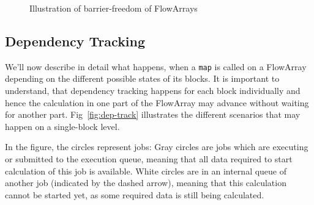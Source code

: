 \documentclass[runningheads,a4paper,fleqn]{llncs}
\begin{document}
\begin{figure}
  \caption{Illustration of barrier-freedom of FlowArrays}
  \label{fig:barrier-free}
\end{figure}

\subsection{Dependency Tracking}
We'll now describe in detail what happens, when a \texttt{map} is
called on a FlowArray depending on the different possible states of
its blocks.  It is important to understand, that dependency tracking
happens for each block individually and hence the calculation in one
part of the FlowArray may advance without waiting for another
part. Fig~\ref{fig:dep-track} illustrates the different scenarios that
may happen on a single-block level.

In the figure, the circles represent jobs: Gray circles are jobs which 
are executing or submitted to the execution queue, meaning that all 
data required to start calculation of this job is available. White
circles are in an internal queue of another job (indicated by the dashed
arrow), meaning that this calculation cannot be started yet, as some
required data is still being calculated.
\end{document}
